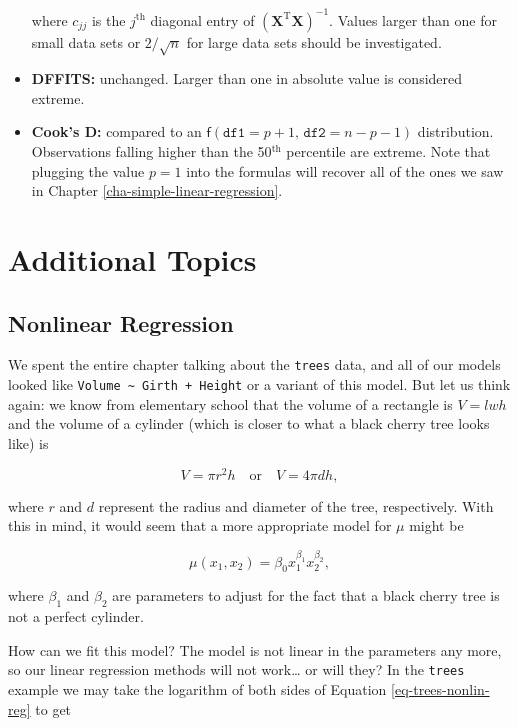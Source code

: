 \documentclass[]{book}
\numberwithin{equation}{chapter}
\numberwithin{figure}{chapter}
\theoremstyle{plain}
\theoremstyle{definition}
\theoremstyle{remark}
\theoremstyle{definition}
\theoremstyle{definition}
\theoremstyle{remark}
\begin{document}
\begin{itemize}
  where \(c_{jj}\) is the \(j^{\mathrm{th}}\) diagonal entry of
  \((\mathbf{X}^{\mathrm{T}}\mathbf{X})^{-1}\). Values larger than one
  for small data sets or \(2/\sqrt{n}\) for large data sets should be
  investigated.
\item
  \textbf{DFFITS:} unchanged. Larger than one in absolute value is
  considered extreme.
\item
  \textbf{Cook's D:} compared to an
  \(\mathsf{f}(\mathtt{df1} = p +  1,\,\mathtt{df2} = n - p - 1)\)
  distribution. Observations falling higher than the
  50\(^{\textrm{th}}\) percentile are extreme. Note that plugging the
  value \(p=1\) into the formulas will recover all of the ones we saw in
  Chapter \ref{cha-simple-linear-regression}.
\end{itemize}

\section{Additional Topics}\label{sec-additional-topics-mlr}

\subsection{Nonlinear Regression}\label{nonlinear-regression}

We spent the entire chapter talking about the \texttt{trees} data, and
all of our models looked like
\texttt{Volume\ \textasciitilde{}\ Girth\ +\ Height} or a variant of
this model. But let us think again: we know from elementary school that
the volume of a rectangle is \(V=lwh\) and the volume of a cylinder
(which is closer to what a black cherry tree looks like) is

\begin{equation}
V=\pi r^{2}h\quad \mbox{or}\quad V=4\pi dh,
\end{equation}

where \(r\) and \(d\) represent the radius and diameter of the tree,
respectively. With this in mind, it would seem that a more appropriate
model for \(\mu\) might be

\begin{equation}
\label{eq-trees-nonlin-reg}
\mu(x_{1},x_{2})=\beta_{0}x_{1}^{\beta_{1}}x_{2}^{\beta_{2}},
\end{equation}

where \(\beta_{1}\) and \(\beta_{2}\) are parameters to adjust for the
fact that a black cherry tree is not a perfect cylinder.

How can we fit this model? The model is not linear in the parameters any
more, so our linear regression methods will not work\ldots{} or will
they? In the \texttt{trees} example we may take the logarithm of both
sides of Equation \eqref{eq-trees-nonlin-reg} to get
\end{document}
